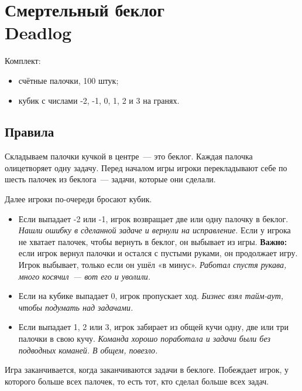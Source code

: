 



\thispagestyle{empty}

\section*{Смертельный беклог \\
{\smaller Deadlog}}

Комплект:

\begin{itemize}
    \item счётные палочки, 100 штук;
    \item кубик с числами -2, -1, 0, 1, 2 и 3 на гранях.
\end{itemize}

\subsection*{Правила}

Складываем палочки кучкой в центре — это беклог.
Каждая палочка олицетворяет одну задачу.
Перед началом игры игроки перекладывают себе по шесть палочек из беклога — задачи, которые они сделали.

Далее игроки по-очереди бросают кубик.

\begin{itemize}
    \item Если выпадает -2 или -1, игрок возвращает две или одну палочку в беклог.
    \textit{Нашли ошибку в сделанной задаче и вернули на исправление.}
    Если у игрока не хватает палочек, чтобы вернуть в беклог, он выбывает из игры.
    \textbf{Важно:} если игрок вернул палочки и остался с пустыми руками, он продолжает игру.
    Игрок выбывает, только если он ушёл «в минус».
    \textit{Работал спустя рукава, много косячил — вот его и уволили.}

    \item Если на кубике выпадает 0, игрок пропускает ход.
    \textit{Бизнес взял тайм-аут, чтобы подумать над задачами.}

    \item Если выпадает 1, 2 или 3, игрок забирает из общей кучи одну, две или три палочки в свою кучу.
    \textit{Команда хорошо поработала и задачи были без подводных команей. В общем, повезло.}
\end{itemize}

Игра заканчивается, когда заканчиваются задачи в беклоге.
Побеждает игрок, у которого больше всех палочек, то есть тот, кто сделал больше всех задач.

